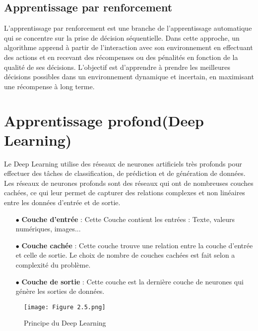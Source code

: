 \subsection{Apprentissage par renforcement}
L’apprentissage par renforcement est une branche de l'apprentissage automatique qui se concentre sur la prise de décision séquentielle. Dans cette approche, un algorithme apprend à partir de l'interaction avec son environnement en effectuant des actions et en recevant des récompenses ou des pénalités en fonction de la qualité de ses décisions. L'objectif est d'apprendre à prendre les meilleures décisions possibles dans un environnement dynamique et incertain, en maximisant une récompense à long terme.
\clearpage
\section{Apprentissage profond(Deep Learning)}
Le Deep Learning utilise des réseaux de neurones artificiels très profonds pour effectuer des tâches de classification, de prédiction et de génération de données. Les réseaux de neurones profonds sont des réseaux qui ont de nombreuses couches cachées, ce qui leur permet de capturer des relations complexes et non linéaires entre les données d'entrée et de sortie. \\

\begin{itemize}
   \item[$\bullet$]\textbf{Couche d’entrée} : Cette Couche contient les entrées : Texte, valeurs numériques, images...
    \item[$\bullet$]\textbf{Couche cachée} :  Cette couche trouve une relation entre la couche d’entrée et celle de sortie. Le choix de nombre de couches cachées est fait selon a complexité du problème.
     \vspace{0.5em}
   \item[$\bullet$]\textbf{Couche de sortie} : Cette couche est la dernière couche de neurones qui génère les sorties de données.
\end{itemize}

\begin{figure}[!h]
  \centering
  \texttt{[image: Figure 2.5.png]}
  \caption{Principe du Deep Learning  }
  \label{fig:Principe du Deep Learning  }
\end{figure}

